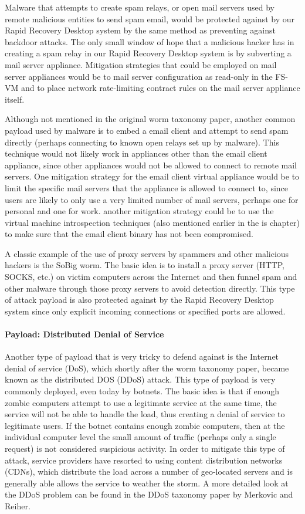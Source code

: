 Malware that attempts to create spam relays, or open mail servers used by remote malicious entities to send spam email, would be protected against by our Rapid Recovery Desktop system by the same method as preventing against backdoor attacks. The only small window of hope that a malicious hacker has in creating a spam relay in our Rapid Recovery Desktop system is by subverting a mail server appliance. Mitigation strategies that could be employed on mail server appliances would be to mail server configuration as read-only in the FS-VM and to place network rate-limiting contract rules on the mail server appliance itself.

Although not mentioned in the original worm taxonomy paper, another common payload used by malware is to embed a email client and attempt to send spam directly (perhaps connecting to known open relays set up by malware). This technique would not likely work in appliances other than the email client appliance, since other appliances would not be allowed to connect to remote mail servers. One mitigation strategy for the email client virtual appliance would be to limit the specific mail servers that the appliance is allowed to connect to, since users are likely to only use a very limited number of mail servers, perhaps one for personal and one for work. another mitigation strategy could be to use the virtual machine introspection techniques (also mentioned earlier in the is chapter) to make sure that the email client binary has not been compromised. 

A classic example of the use of proxy servers by spammers and other malicious hackers is the SoBig worm. The basic idea is to install a proxy server (HTTP, SOCKS, etc.) on victim computers across the Internet and then funnel spam and other malware through those proxy servers to avoid detection directly. This type of attack payload is also protected against by the Rapid Recovery Desktop system since only explicit incoming connections or specified ports are allowed.

\paragraph{Payload: Distributed Denial of Service}
Another type of payload that is very tricky to defend against is the Internet denial of service (DoS), which shortly after the worm taxonomy paper, became known as the distributed DOS (DDoS) attack. This type of payload is very commonly deployed, even today by botnets. The basic idea is that if enough zombie computers attempt to use a legitimate service at the same time, the service will not be able to handle the load, thus creating a denial of service to legitimate users. If the botnet contains enough zombie computers, then at the individual computer level the small amount of traffic (perhaps only a single request) is not considered suspicious activity. In order to mitigate this type of attack, service providers have resorted to using content distribution networks (CDNs), which distribute the load across a number of geo-located servers and is generally able allows the service to weather the storm. A more detailed look at the DDoS problem can be found in the DDoS taxonomy paper by Merkovic and Reiher\cite{DDoS_taxonomy_2004}.

